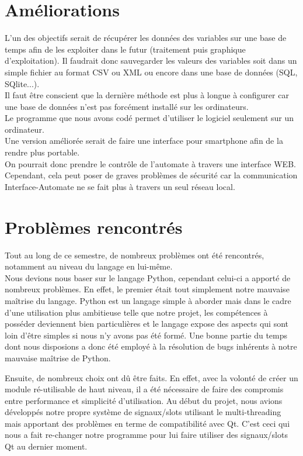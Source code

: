 \documentclass[12pt]{report}    %
\begin{document}
\section{Améliorations}

L'un des objectifs serait de récupérer les données des variables sur une base de temps afin de les exploiter dans le futur (traitement puis graphique d'exploitation). Il faudrait donc sauvegarder les valeurs des variables soit dans un simple fichier au format CSV ou XML ou encore dans une base de données (SQL, SQlite...). \\
Il faut être conscient que la dernière méthode est plus à longue à configurer car une base de données n'est pas forcément installé sur les ordinateurs. \\

Le programme que nous avons codé permet d'utiliser le logiciel seulement sur un ordinateur. \\
Une version améliorée serait de faire une interface pour smartphone afin de la rendre plus portable. \\
On pourrait donc prendre le contrôle de l'automate à travers une interface WEB. Cependant, cela peut poser de graves problèmes de sécurité car la communication Interface-Automate ne se fait plus à travers un seul réseau local.


\section{Problèmes rencontrés}

Tout au long de ce semestre, de nombreux problèmes ont été rencontrés, notamment au niveau du langage en lui-même. \\
Nous devions nous baser sur le langage Python, cependant celui-ci a apporté de nombreux problèmes.
\newline
En effet, le premier était tout simplement notre mauvaise maîtrise du langage. Python est un langage simple à aborder mais dans le cadre d'une utilisation plus ambitieuse telle que notre projet, les compétences à posséder deviennent bien particulières et le langage expose des aspects qui sont loin d'être simples si nous n'y avons pas été formé. \newline
Une bonne partie du temps dont nous disposions a donc été employé à la résolution de bugs inhérents à notre mauvaise maîtrise de Python.

\smallSkip

Ensuite, de nombreux choix ont dû être faits. En effet, avec la volonté de créer un module ré-utilisable de haut niveau, il a été nécessaire de faire des compromis entre performance et simplicité d'utilisation.\newline
Au début du projet, nous avions développés notre propre système de signaux/slots utilisant le multi-threading mais apportant des problèmes en terme de compatibilité avec Qt. C'est ceci qui nous a fait re-changer notre programme pour lui faire utiliser des signaux/slots Qt au dernier moment.
\end{document}
